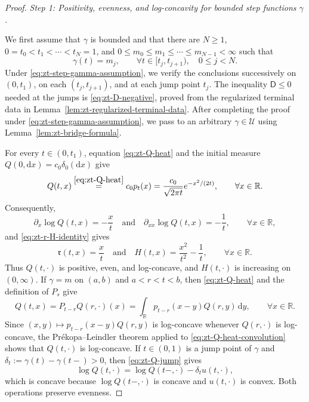 \documentclass[10pt]{amsart}
\theoremstyle{definition}
\theoremstyle{remark}
\numberwithin{equation}{section}
\newcommand{\R}{\mathbb R}
\newcommand{\1}{\mathbf 1}
\newcommand{\cU}{\mathcal U}
\newcommand{\dd}{\,\mathrm d}
\newcommand{\stackref}[2]{\stackrel{#2}{#1}}
\begin{document}
\begin{proof}
\smallskip
\noindent\emph{Step 1: Positivity, evenness, and log-concavity for bounded step functions $\gamma$.}

We first assume that $\gamma$ is bounded and that there are $N\geq1$, $0=t_0<t_1<\cdots<t_N=1$, and $0\leq m_0\leq m_1\leq\cdots\leq m_{N-1}<\infty$ such that
\begin{equation}
 \gamma(t)=m_j,
 \qquad \forall t\in[t_j,t_{j+1}),\quad 0\leq j<N.
 \label{eq:zt-step-gamma-assumption}
\end{equation}
Under \eqref{eq:zt-step-gamma-assumption}, we verify the conclusions successively on $(0,t_1)$, on each $(t_j,t_{j+1})$, and at each jump point $t_j$. The inequality $\mathsf D\leq0$ needed at the jumps is \eqref{eq:zt-D-negative}, proved from the regularized terminal data in Lemma~\ref{lem:zt-regularized-terminal-data}. After completing the proof under \eqref{eq:zt-step-gamma-assumption}, we pass to an arbitrary $\gamma\in\cU$ using Lemma~\ref{lem:zt-bridge-formula}.

For every $t\in(0,t_1)$, equation \eqref{eq:zt-Q-heat} and the initial measure $Q(0,\mathrm d x)=c_0\delta_0(\mathrm d x)$ give
\begin{equation*}
 Q(t,x)
 \stackref{=}{\eqref{eq:zt-Q-heat}}
 c_0p_t(x)=\frac{c_0}{\sqrt{2\pi t}}e^{-x^2/(2t)},
 \qquad \forall x\in\R.
\end{equation*}
Consequently,
\begin{equation*}
 \partial_x\log Q(t,x)=-\frac xt
 \quad\text{and}\quad
 \partial_{xx}\log Q(t,x)=-\frac1t,
 \qquad \forall x\in\R,
\end{equation*}
and \eqref{eq:zt-r-H-identity} gives
\begin{equation*}
 \mathfrak r(t,x)=\frac xt\quad\text{and}\quad
 H(t,x)=\frac{x^2}{t^2}-\frac1t,
 \qquad \forall x\in\R.
\end{equation*}
Thus $Q(t,\cdot)$ is positive, even, and log-concave, and $H(t,\cdot)$ is increasing on $(0,\infty)$. If $\gamma=m$ on $(a,b)$ and $a<r<t<b$, then \eqref{eq:zt-Q-heat} and the definition of $P_s$ give
\begin{equation}
 Q(t,x)=P_{t-r}Q(r,\cdot)(x)
 =\int_\R p_{t-r}(x-y)Q(r,y)\dd y,
 \qquad \forall x\in\R.
 \label{eq:zt-Q-heat-convolution}
\end{equation}
Since $(x,y)\mapsto p_{t-r}(x-y)Q(r,y)$ is log-concave whenever $Q(r,\cdot)$ is log-concave, the Pr\'ekopa--Leindler theorem applied to \eqref{eq:zt-Q-heat-convolution} shows that $Q(t,\cdot)$ is log-concave. If $t\in(0,1)$ is a jump point of $\gamma$ and $\delta_t:=\gamma(t)-\gamma(t-)>0$, then \eqref{eq:zt-Q-jump} gives
\begin{equation*}
 \log Q(t,\cdot)=\log Q(t-,\cdot)-\delta_tu(t,\cdot),
\end{equation*}
which is concave because $\log Q(t-,\cdot)$ is concave and $u(t,\cdot)$ is convex. Both operations preserve evenness.


\end{proof}
\end{document}
